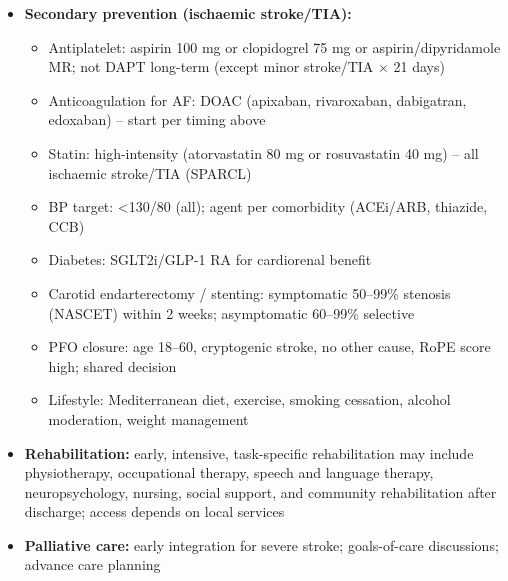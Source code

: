 \begin{itemize}
\begin{itemize}
        \item VTE prophylaxis: mechanical (IPC) from admission; pharmacological (LMWH) after 24--48 h if no haemorrhage / low bleed risk
        \item Nutrition: NG tube if dysphagia >7 days; PEG if prolonged
        \item Secondary prevention initiation before discharge
    \end{itemize}
    \item \textbf{Secondary prevention (ischaemic stroke/TIA):}
    \begin{itemize}
        \item Antiplatelet: aspirin 100 mg or clopidogrel 75 mg or aspirin/dipyridamole MR; not DAPT long-term (except minor stroke/TIA $\times$ 21 days)
        \item Anticoagulation for AF: DOAC (apixaban, rivaroxaban, dabigatran, edoxaban) -- start per timing above
        \item Statin: high-intensity (atorvastatin 80 mg or rosuvastatin 40 mg) -- all ischaemic stroke/TIA (SPARCL)
        \item BP target: <130/80 (all); agent per comorbidity (ACEi/ARB, thiazide, CCB)
        \item Diabetes: SGLT2i/GLP-1 RA for cardiorenal benefit
        \item Carotid endarterectomy / stenting: symptomatic 50--99\% stenosis (NASCET) within 2 weeks; asymptomatic 60--99\% selective
        \item PFO closure: age 18--60, cryptogenic stroke, no other cause, RoPE score high; shared decision
        \item Lifestyle: Mediterranean diet, exercise, smoking cessation, alcohol moderation, weight management
    \end{itemize}
    \item \textbf{Rehabilitation:} early, intensive, task-specific rehabilitation may include physiotherapy, occupational therapy, speech and language therapy, neuropsychology, nursing, social support, and community rehabilitation after discharge; access depends on local services
    \item \textbf{Palliative care:} early integration for severe stroke; goals-of-care discussions; advance care planning
\end{itemize}

